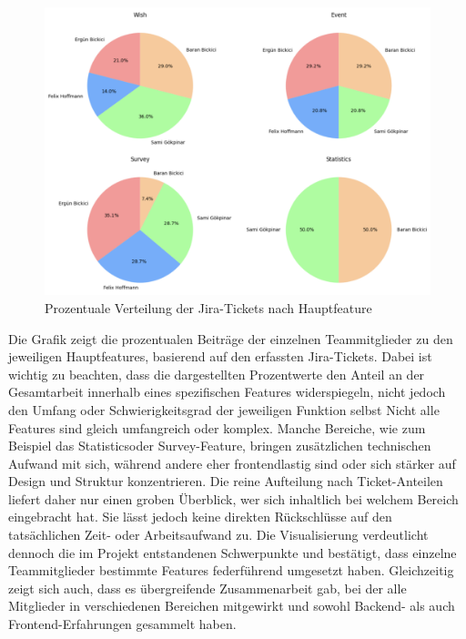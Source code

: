 \documentclass[a4paper,12pt]{article}
\begin{document}
\begin{figure}[H]
    \centering
    \includegraphics[width=1\textwidth]{Abbildungen/aufgaben_verteilung.png}
    \caption{Prozentuale Verteilung der Jira-Tickets nach Hauptfeature}
    \label{fig:aufgaben_verteilung}
\end{figure}

\noindent
Die Grafik zeigt die prozentualen Beiträge der einzelnen Teammitglieder zu den jeweiligen Hauptfeatures, basierend auf den erfassten Jira-Tickets. Dabei ist wichtig zu beachten, dass die dargestellten Prozentwerte den Anteil an der Gesamtarbeit innerhalb eines spezifischen Features widerspiegeln, nicht jedoch den Umfang oder Schwierigkeitsgrad der jeweiligen Funktion selbst Nicht alle Features sind gleich umfangreich oder komplex. Manche Bereiche, wie zum Beispiel das Statisticsoder Survey-Feature, bringen zusätzlichen technischen Aufwand mit sich, während andere eher frontendlastig sind oder sich stärker auf Design und Struktur konzentrieren. Die reine Aufteilung nach Ticket-Anteilen liefert daher nur einen groben Überblick, wer sich inhaltlich bei welchem Bereich eingebracht hat. Sie lässt jedoch keine direkten Rückschlüsse auf den tatsächlichen Zeit- oder Arbeitsaufwand zu. Die Visualisierung verdeutlicht dennoch die im Projekt entstandenen Schwerpunkte und bestätigt, dass einzelne Teammitglieder bestimmte Features federführend umgesetzt haben. Gleichzeitig zeigt sich auch, dass es übergreifende Zusammenarbeit gab, bei der alle Mitglieder in verschiedenen Bereichen mitgewirkt und sowohl Backend- als auch Frontend-Erfahrungen gesammelt haben.

\newpage
\end{document}
